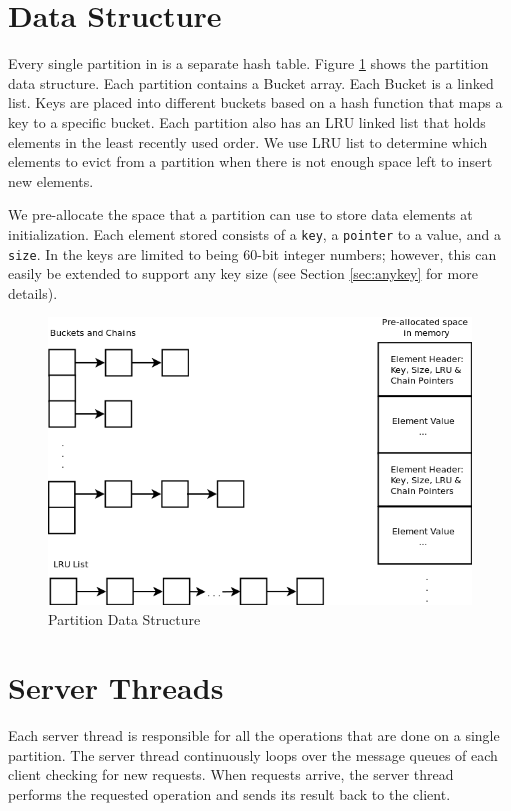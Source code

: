 \section{Data Structure}
\label{sec:datastructure}

Every single partition in \cphash{} is a separate hash table. Figure \ref{fig:partition} shows the partition data structure.
Each partition contains a Bucket array. Each Bucket is a linked list. Keys are placed into different buckets based on a hash 
function that maps a key to a specific bucket. Each partition also has an LRU linked list that holds 
elements in the least recently used order. We use LRU list to determine which elements to evict from
a partition when there is not enough space left to insert new elements.

We pre-allocate the space that a partition can use to store data elements at initialization. 
Each element stored consists of a \texttt{key}, a \texttt{pointer} to a value, and a \texttt{size}. 
In \cphash{} the keys are limited to being 60-bit integer numbers; however, this can easily be 
extended to support any key size (see Section \ref{sec:anykey} for more details). 

\begin{figure}[!ht]
  \centering
  \includegraphics[width=0.8\linewidth]{figs/partition.png}
  \caption{Partition Data Structure}
  \label{fig:partition}
\end{figure}

\section{Server Threads}
\label{sec:serverthreads}

Each server thread is responsible for all the operations that are done on a single partition. 
The server thread continuously loops over the message queues of each client checking for new requests. When requests arrive, the 
server thread performs the requested operation and sends its result back to the client. 

